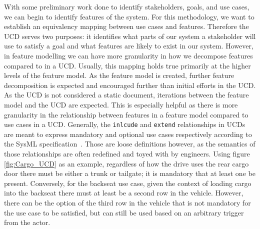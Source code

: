 With some preliminary work done to identify stakeholders, goals, and use cases, we can begin to identify features of the system. For this methodology, we want to establish an equivalency mapping between use cases and features. Therefore the \ac{UCD} serves two purposes: it identifies what parts of our system a stakeholder will use to satisfy a goal and what features are likely to exist in our system. However, in feature modelling we can have more granularity in how we decompose features compared to in a \ac{UCD}. Usually, this mapping holds true primarily at the higher levels of the feature model. As the feature model is created, further feature decomposition is expected and encouraged further than initial efforts in the \ac{UCD}. As the \ac{UCD} is not considered a static document, iterations between the feature model and the \ac{UCD} are expected. This is especially helpful as there is more granularity in the relationship between features in a feature model compared to use cases in a \ac{UCD}. Generally, the \texttt{inlcude} and \texttt{extend} relationships in \ac{UCD}s are meant to express mandatory and optional use cases respectively according to the SysML specification~\cite{sysml2019omg}. Those are loose definitions however, as the semantics of those relationships are often redefined and toyed with by engineers. Using figure \ref{fig:Cargo_UCD} as an example, regardless of how the drive uses the rear cargo door there must be either a trunk or tailgate; it is mandatory that at least one be present. Conversely, for the backseat use case, given the context of loading cargo into the backseat there must at least be a second row in the vehicle. However, there can be the option of the third row in the vehicle that is not mandatory for the use case to be satisfied, but can still be used based on an arbitrary trigger from the actor.


